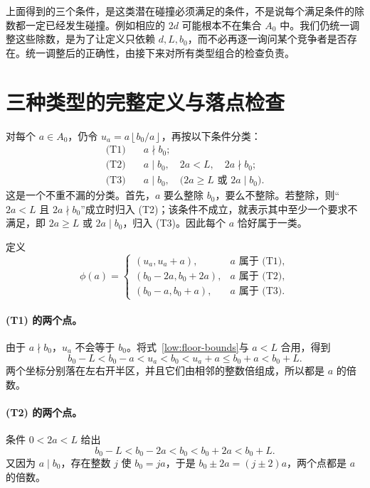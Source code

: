 \documentclass[UTF8,a4paper,oneside,openany,fontset=fandol,zihao=-4]{ctexbook}
\theoremstyle{guide}
\newcommand{\floor}[1]{\left\lfloor#1\right\rfloor}
\begin{document}
上面得到的三个条件，是这类潜在碰撞必须满足的条件，不是说每个满足条件的除数都一定已经发生碰撞。例如相应的 $2d$ 可能根本不在集合 $A_0$ 中。我们仍统一调整这些除数，是为了让定义只依赖 $d,L,b_0$，而不必再逐一询问某个竞争者是否存在。统一调整后的正确性，由接下来对所有类型组合的检查负责。

\section{三种类型的完整定义与落点检查}

对每个 $a\in A_0$，仍令 $u_a=a\floor{b_0/a}$，再按以下条件分类：
\begin{align*}
  \text{(T1)}\quad& a\nmid b_0;\\
  \text{(T2)}\quad& a\mid b_0,\quad 2a<L,\quad 2a\nmid b_0;\\
  \text{(T3)}\quad& a\mid b_0,\quad
       \bigl(2a\geq L\text{ 或 }2a\mid b_0\bigr).
\end{align*}
这是一个不重不漏的分类。首先，$a$ 要么整除 $b_0$，要么不整除。若整除，则“$2a<L$ 且 $2a\nmid b_0$”成立时归入 (T2)；该条件不成立，就表示其中至少一个要求不满足，即 $2a\geq L$ 或 $2a\mid b_0$，归入 (T3)。因此每个 $a$ 恰好属于一类。

定义
\begin{equation}\label{low:three-type-map}
  \phi(a)=
  \begin{cases}
    (u_a,u_a+a),&a\text{ 属于 (T1)},\\
    (b_0-2a,b_0+2a),&a\text{ 属于 (T2)},\\
    (b_0-a,b_0+a),&a\text{ 属于 (T3)}.
  \end{cases}
\end{equation}

\paragraph{(T1) 的两个点。}
由于 $a\nmid b_0$，$u_a$ 不会等于 $b_0$。将式~\eqref{low:floor-bounds}与 $a<L$ 合用，得到
\[
  b_0-L<b_0-a<u_a<b_0<u_a+a\leq b_0+a<b_0+L.
\]
两个坐标分别落在左右开半区，并且它们由相邻的整数倍组成，所以都是 $a$ 的倍数。

\paragraph{(T2) 的两个点。}
条件 $0<2a<L$ 给出
\[
  b_0-L<b_0-2a<b_0<b_0+2a<b_0+L.
\]
又因为 $a\mid b_0$，存在整数 $j$ 使 $b_0=ja$，于是 $b_0\pm2a=(j\pm2)a$，两个点都是 $a$ 的倍数。
\end{document}
